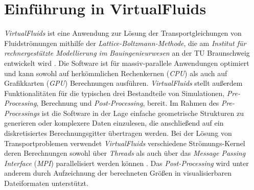 \chapter{Einführung in VirtualFluids}

\textit{VirtualFluids} ist eine Anwendung zur Lösung der Transportgleichungen von Fluidströmungen mithilfe der \textit{Lattice-Boltzmann-Methode}, die am \textit{Institut für rechnergestützte Modellierung im Bauingenieurwesen} an der TU Braunschweig entwickelt wird \cite{Kutscher2020}. Die Software ist für massiv-parallele Anwendungen optimiert und kann sowohl auf herkömmlichen Rechenkernen (\textit{CPU}) als auch auf Grafikkarten (\textit{GPU}) Berechnungen ausführen. \textit{VirtualFluids} stellt außerdem Funktionalitäten für die typischen drei Bestandteile von Simulationen, \textit{Pre-Processing}, Berechnung und \textit{Post-Processing}, bereit. Im Rahmen des \textit{Pre-Processings} ist die Software in der Lage einfache geometrische Strukturen zu generieren oder komplexere Daten einzulesen, die anschließend auf ein diskretisiertes Berechnungsgitter übertragen werden. Bei der Lösung von Transportproblemen verwendet \textit{VirtualFluids} verschiedene Strömungs-Kernel deren Berechnungen sowohl über \textit{Threads} als auch über das \textit{Message Passing Interface} (\textit{MPI}) parallelisiert werden können \cite{MPIForum1994}. Das \textit{Post-Processing} wird unter anderem durch Aufzeichnung der berechneten Größen in visualisierbaren Dateiformaten unterstützt.